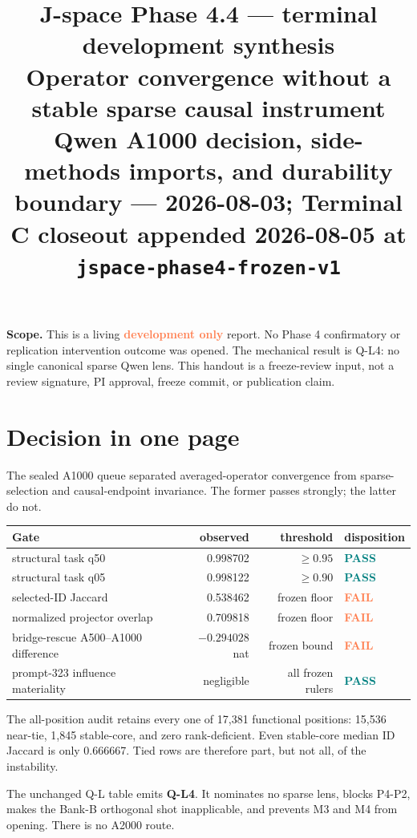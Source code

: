 \documentclass[10pt]{article}
\title{\vspace{-1.2em}J-space Phase 4.4 --- terminal development synthesis\\
\large Operator convergence without a stable sparse causal instrument\\[3pt]
\normalsize\textcolor{muted}{Qwen A1000 decision, side-methods imports, and durability boundary --- 2026-08-03; Terminal C closeout appended 2026-08-05 at \texttt{jspace-phase4-frozen-v1}}}
\author{}\date{}
\newcommand{\dev}{\textcolor{coral}{\textbf{development only}}}
\newcommand{\pass}{\textcolor{teal}{\textbf{PASS}}}
\newcommand{\fail}{\textcolor{coral}{\textbf{FAIL}}}
\begin{document}
\maketitle
\vspace{-2.7em}

\textbf{Scope.} This is a living \dev{} report. No Phase 4 confirmatory or
replication intervention outcome was opened. The mechanical result is Q-L4:
no single canonical sparse Qwen lens. This handout is a freeze-review input,
not a review signature, PI approval, freeze commit, or publication claim.

\section{Decision in one page}

The sealed A1000 queue separated averaged-operator convergence from
sparse-selection and causal-endpoint invariance. The former passes strongly;
the latter do not.

\begin{center}\small
\begin{tabular}{L{5.0cm}rrL{3.8cm}}
\toprule
Gate & observed & threshold & disposition\\
\midrule
structural task q50 & 0.998702 & $\geq 0.95$ & \pass\\
structural task q05 & 0.998122 & $\geq 0.90$ & \pass\\
selected-ID Jaccard & 0.538462 & frozen floor & \fail\\
normalized projector overlap & 0.709818 & frozen floor & \fail\\
bridge-rescue A500--A1000 difference & $-0.294028$ nat & frozen bound & \fail\\
prompt-323 influence materiality & negligible & all frozen rulers & \pass\\
\bottomrule
\end{tabular}
\end{center}

The all-position audit retains every one of 17,381 functional positions:
15,536 near-tie, 1,845 stable-core, and zero rank-deficient. Even stable-core
median ID Jaccard is only 0.666667. Tied rows are therefore part, but not all,
of the instability.

The unchanged Q-L table emits \textbf{Q-L4}. It nominates no sparse lens,
blocks P4-P2, makes the Bank-B orthogonal shot inapplicable, and prevents M3
and M4 from opening. There is no A2000 route.
\end{document}
